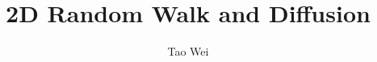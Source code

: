 \documentclass[12pt]{article}
\begin{document}
\title{2D Random Walk and Diffusion}
\author{Tao Wei}
\date{}

\maketitle

%
%
\end{document}

